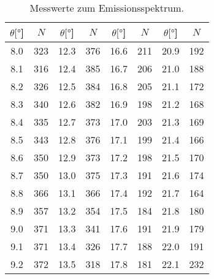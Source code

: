 \begin{table}[H]
  \centering
  \caption{Messwerte zum Emissionsspektrum.}
  \begin{tabular}{S[table-format=2.1] c | S[table-format=2.1] c | S[table-format=2.1] c | S[table-format=2.1] c}
  \toprule
  {$\theta [\si{\degree}$]} &
  {$N$} &
  {$\theta [\si{\degree}$]} &
  {$N$} &
  {$\theta [\si{\degree}$]} &
  {$N$} &
  {$\theta [\si{\degree}$]} &
  {$N$} \\
  \midrule
\num{8.0}  & \num{323}  &   \num{12.3} & \num{376}  &   \num{16.6} & \num{211}  &   \num{20.9} & \num{192}  \\
\num{8.1}  & \num{316}  &   \num{12.4} & \num{385}  &   \num{16.7} & \num{206}  &   \num{21.0} & \num{188}  \\
\num{8.2}  & \num{326}  &   \num{12.5} & \num{384}  &   \num{16.8} & \num{205}  &   \num{21.1} & \num{172}  \\ 
\num{8.3}  & \num{340}  &   \num{12.6} & \num{382}  &   \num{16.9} & \num{198}  &   \num{21.2} & \num{168}  \\
\num{8.4}  & \num{335}  &   \num{12.7} & \num{373}  &   \num{17.0} & \num{203}  &   \num{21.3} & \num{169}  \\
\num{8.5}  & \num{343}  &   \num{12.8} & \num{376}  &   \num{17.1} & \num{199}  &   \num{21.4} & \num{166}  \\
\num{8.6}  & \num{350}  &   \num{12.9} & \num{373}  &   \num{17.2} & \num{198}  &   \num{21.5} & \num{170}  \\
\num{8.7}  & \num{350}  &   \num{13.0} & \num{375}  &   \num{17.3} & \num{191}  &   \num{21.6} & \num{174}  \\
\num{8.8}  & \num{366}  &   \num{13.1} & \num{366}  &   \num{17.4} & \num{192}  &   \num{21.7} & \num{164}  \\
\num{8.9}  & \num{357}  &   \num{13.2} & \num{354}  &   \num{17.5} & \num{184}  &   \num{21.8} & \num{180}  \\
\num{9.0}  & \num{371}  &   \num{13.3} & \num{341}  &   \num{17.6} & \num{191}  &   \num{21.9} & \num{179}  \\
\num{9.1}  & \num{371}  &   \num{13.4} & \num{326}  &   \num{17.7} & \num{188}  &   \num{22.0} & \num{191}  \\
\num{9.2}  & \num{372}  &   \num{13.5} & \num{318}  &   \num{17.8} & \num{181}  &   \num{22.1} & \num{232}  \\

\end{tabular}
\end{table}
